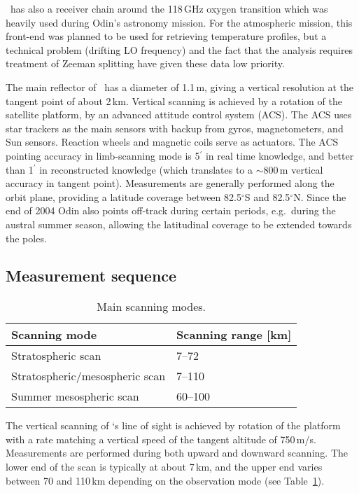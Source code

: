 \smr\ has also a receiver chain around the 118\,GHz oxygen transition which was
heavily used during Odin's astronomy mission. For the atmospheric mission, this
front-end was planned to be used for retrieving temperature profiles, but a
technical problem (drifting LO frequency) and the fact that the analysis
requires treatment of Zeeman splitting have given these data low priority. 

The main reflector of \smr\ has a diameter of 1.1\,m, giving a
vertical resolution at the tangent point of about 2\,km. 
Vertical scanning is achieved by a rotation of the satellite
platform, by an advanced attitude control system (ACS). 
The ACS uses star trackers as the main sensors with backup from gyros, 
magnetometers, and Sun sensors. Reaction wheels and magnetic coils serve as 
actuators. The ACS pointing accuracy in limb-scanning mode is 5\(^{'}\) in
real time knowledge, and better than 1\(^{'}\) in reconstructed knowledge
(which translates to a \(\sim\)800\,m vertical accuracy in tangent point).
Measurements are generally performed along the orbit plane, providing a
latitude coverage between 82.5$^{\circ}$S and 82.5$^{\circ}$N. Since the end of
2004 Odin also points off-track during certain periods, e.g.\ during the
austral summer season, allowing the latitudinal coverage to be extended towards
the poles. 




\subsection{Measurement sequence}

\begin{table}
\caption{Main scanning modes.}
\label{table:scanpattern}
\begin{tabular}{|l|l|}
  \hline
  \textbf{Scanning mode} & \textbf{Scanning range {[}km{]}} \\
  \hline
  Stratospheric scan     &  7--72 \\
 \hline
 Stratospheric/mesospheric scan &  7--110  \\
 \hline
 Summer mesospheric scan & 60--100 \\
 \hline
\end{tabular}
\end{table}


The vertical scanning of \smr`s line of sight is achieved by
rotation of the platform with a rate matching a vertical speed of
the tangent altitude of 750\,m/s. Measurements are performed during
both upward and downward scanning. The lower end of the scan is typically
at about 7\,km, and the upper end varies between 70 and 110\,km depending on
the observation mode (see Table~\ref{table:scanpattern}).


